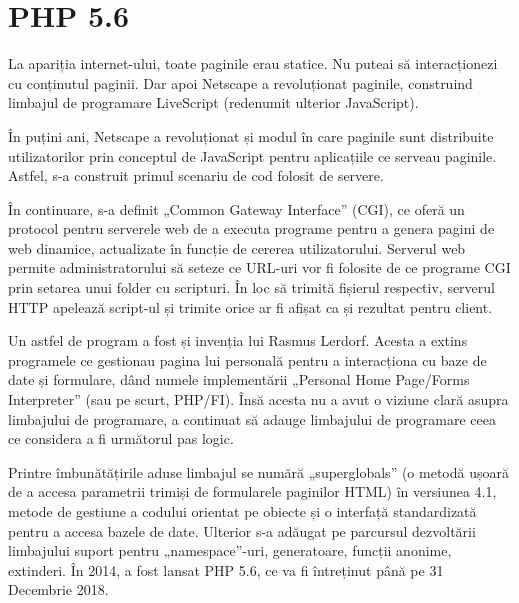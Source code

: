 \section{PHP 5.6}
	La apariția internet-ului, toate paginile erau statice.
	Nu puteai să interacționezi cu conținutul paginii.
	Dar apoi Netscape a revoluționat paginile, construind limbajul de programare LiveScript (redenumit ulterior JavaScript).

	În puțini ani, Netscape a revoluționat și modul în care paginile sunt distribuite utilizatorilor prin conceptul de JavaScript pentru aplicațiile ce serveau paginile.
	Astfel, s-a construit primul scenariu de cod folosit de servere. \cite{TheInformationRevolution}

	În continuare, s-a definit „Common Gateway Interface” (CGI), ce oferă un protocol pentru serverele web de a executa programe pentru a genera pagini de web dinamice, actualizate în funcție de cererea utilizatorului.
	Serverul web permite administratorului să seteze ce URL-uri vor fi folosite de ce programe CGI prin setarea unui folder cu scripturi.
	În loc să trimită fișierul respectiv, serverul HTTP apelează script-ul și trimite orice ar fi afișat ca și rezultat pentru client. \cite{cgi}

	Un astfel de program a fost și invenția lui Rasmus Lerdorf.
	Acesta a extins programele ce gestionau pagina lui personală pentru a interacționa cu baze de date și formulare, dând numele implementării „Personal Home Page/Forms Interpreter” (sau pe scurt, PHP/FI).
	Însă acesta nu a avut o viziune clară asupra limbajului de programare, a continuat să adauge limbajului de programare ceea ce considera a fi următorul pas logic. \cite{php_code}

	Printre îmbunătățirile aduse limbajul se numără „superglobals” (o metodă ușoară de a accesa parametrii trimiși de formularele paginilor HTML) în versiunea 4.1, metode de gestiune a codului orientat pe obiecte și o interfață standardizată pentru a accesa bazele de date.
	Ulterior s-a adăugat pe parcursul dezvoltării limbajului suport pentru „namespace”-uri, generatoare, funcții anonime, extinderi.
	În 2014, a fost lansat PHP 5.6, ce va fi întreținut până pe 31 Decembrie 2018. \cite{php_supported_versions}
